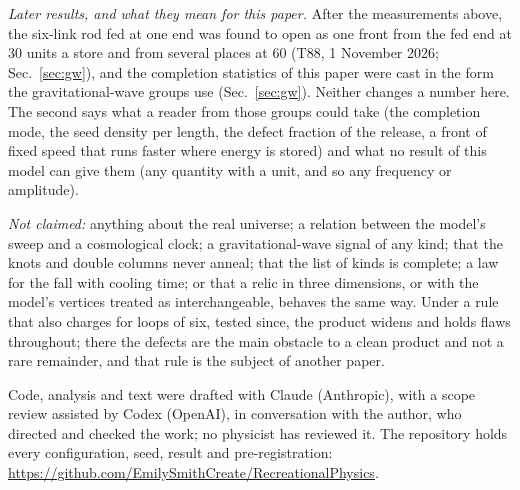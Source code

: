 \documentclass[aps,pre,10pt,twocolumn,superscriptaddress,nofootinbib]{revtex4-2}
\begin{document}
\emph{Later results, and what they mean for this paper.} After the measurements above, the six-link rod fed at one
end was found to open as one front from the fed end at 30 units a store and from several places at 60 (T88,
1 November 2026; Sec.~\ref{sec:gw}), and the completion statistics of this paper were cast in the form the
gravitational-wave groups use (Sec.~\ref{sec:gw}). Neither changes a number here. The second says what a reader
from those groups could take (the completion mode, the seed density per length, the defect fraction of the release,
a front of fixed speed that runs faster where energy is stored) and what no result of this model can give them (any
quantity with a unit, and so any frequency or amplitude).

\emph{Not claimed:} anything about the real universe; a relation between the model's sweep and a cosmological
clock; a gravitational-wave signal of any kind; that the knots and double columns never anneal; that the list of kinds is complete; a law for the fall
with cooling time; or that a relic in three dimensions, or with the model's vertices treated as
interchangeable, behaves the same way. Under a rule that also charges for loops of six, tested since, the
product widens and holds flaws throughout; there the defects are the main obstacle to a clean product and not
a rare remainder, and that rule is the subject of another paper.

\begin{acknowledgments}
Code, analysis and text were drafted with Claude (Anthropic), with a scope review assisted by Codex (OpenAI),
in conversation with the author, who directed and checked the work; no physicist has reviewed it. The
repository holds every configuration, seed, result and pre-registration:
\url{https://github.com/EmilySmithCreate/RecreationalPhysics}.
\end{acknowledgments}
\end{document}
